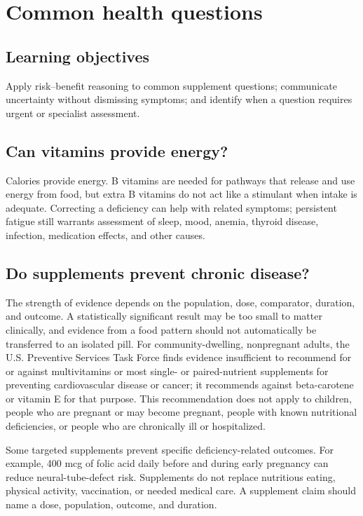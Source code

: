 \chapter{Common health questions}
\section{Learning objectives}
Apply risk--benefit reasoning to common supplement questions; communicate uncertainty without dismissing symptoms; and identify when a question requires urgent or specialist assessment.

\section{Can vitamins provide energy?}
Calories provide energy. B vitamins are needed for pathways that release and use energy from food, but extra B vitamins do not act like a stimulant when intake is adequate. Correcting a deficiency can help with related symptoms; persistent fatigue still warrants assessment of sleep, mood, anemia, thyroid disease, infection, medication effects, and other causes. \cite{odsThiamin,odsNiacin,odsB12}

\section{Do supplements prevent chronic disease?}
The strength of evidence depends on the population, dose, comparator, duration, and outcome. A statistically significant result may be too small to matter clinically, and evidence from a food pattern should not automatically be transferred to an isolated pill. For community-dwelling, nonpregnant adults, the U.S. Preventive Services Task Force finds evidence insufficient to recommend for or against multivitamins or most single- or paired-nutrient supplements for preventing cardiovascular disease or cancer; it recommends against beta-carotene or vitamin E for that purpose. This recommendation does not apply to children, people who are pregnant or may become pregnant, people with known nutritional deficiencies, or people who are chronically ill or hospitalized. \cite{uspstfSupplements}

Some targeted supplements prevent specific deficiency-related outcomes. For example, 400 mcg of folic acid daily before and during early pregnancy can reduce neural-tube-defect risk. Supplements do not replace nutritious eating, physical activity, vaccination, or needed medical care. A supplement claim should name a dose, population, outcome, and duration. \cite{cdcFolicAcid}


